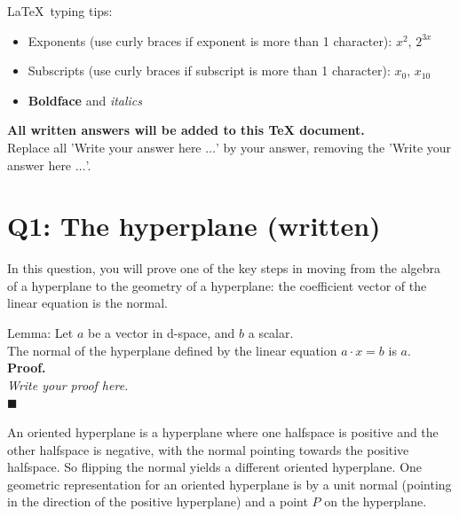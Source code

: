 \documentclass[10pt]{article}
\renewcommand{\(}{\left(}
\renewcommand{\)}{\right)}
\renewcommand\qedsymbol{$\blacksquare$}
\newenvironment{prf}{{\bfseries Proof.}}{\qedsymbol}
\theoremstyle{plain}
\theoremstyle{plain}
\theoremstyle{definition}
\begin{document}
\LaTeX\ typing tips:
\begin{itemize}
    \item Exponents (use curly braces if exponent is more than 1 character): 
          $x^2$, $2^{3x}$
    \item Subscripts (use curly braces if subscript is more than 1 character): 
          $x_0$, $x_{10}$
    \item {\bf Boldface} and {\em italics}
\end{itemize}

{\bf All written answers will be added to this TeX document.}\\
Replace all 'Write your answer here $\ldots$' by your answer,
removing the 'Write your answer here $\ldots$'.

\newpage


\section*{Q1: The hyperplane (written)}

    In this question, you will prove one of the key steps 
    in moving from the algebra of a hyperplane to the geometry of a hyperplane:
    the coefficient vector of the linear equation is the normal.

    \begin{shaded}
      Lemma: Let $a$ be a vector in d-space, and $b$ a scalar.\\
      The normal of the hyperplane defined by the linear
      equation $a \cdot x = b$ is $a$.\\
      \begin{prf} \\
      {\em Write your proof here.}\\
      \end{prf}
    \end{shaded}

    An oriented hyperplane is a hyperplane where one halfspace is positive
    and the other halfspace is negative, with the normal pointing towards
    the positive halfspace.
    So flipping the normal yields a different oriented hyperplane.
    One geometric representation for an oriented hyperplane
    is by a unit normal (pointing in the direction of the positive
    hyperplane) and a point $P$ on the hyperplane.
\end{document}
